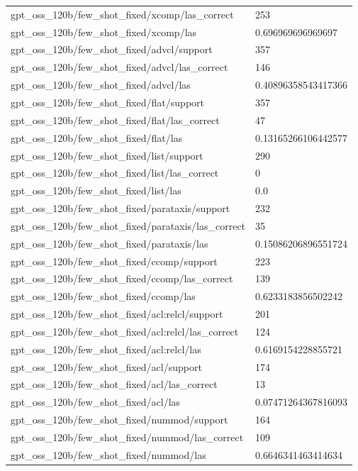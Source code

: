\begin{tabular}{ll}
gpt\_oss\_120b/few\_shot\_fixed/xcomp/las\_correct & 253 \\
gpt\_oss\_120b/few\_shot\_fixed/xcomp/las & 0.696969696969697 \\
gpt\_oss\_120b/few\_shot\_fixed/advcl/support & 357 \\
gpt\_oss\_120b/few\_shot\_fixed/advcl/las\_correct & 146 \\
gpt\_oss\_120b/few\_shot\_fixed/advcl/las & 0.40896358543417366 \\
gpt\_oss\_120b/few\_shot\_fixed/flat/support & 357 \\
gpt\_oss\_120b/few\_shot\_fixed/flat/las\_correct & 47 \\
gpt\_oss\_120b/few\_shot\_fixed/flat/las & 0.13165266106442577 \\
gpt\_oss\_120b/few\_shot\_fixed/list/support & 290 \\
gpt\_oss\_120b/few\_shot\_fixed/list/las\_correct & 0 \\
gpt\_oss\_120b/few\_shot\_fixed/list/las & 0.0 \\
gpt\_oss\_120b/few\_shot\_fixed/parataxis/support & 232 \\
gpt\_oss\_120b/few\_shot\_fixed/parataxis/las\_correct & 35 \\
gpt\_oss\_120b/few\_shot\_fixed/parataxis/las & 0.15086206896551724 \\
gpt\_oss\_120b/few\_shot\_fixed/ccomp/support & 223 \\
gpt\_oss\_120b/few\_shot\_fixed/ccomp/las\_correct & 139 \\
gpt\_oss\_120b/few\_shot\_fixed/ccomp/las & 0.6233183856502242 \\
gpt\_oss\_120b/few\_shot\_fixed/acl:relcl/support & 201 \\
gpt\_oss\_120b/few\_shot\_fixed/acl:relcl/las\_correct & 124 \\
gpt\_oss\_120b/few\_shot\_fixed/acl:relcl/las & 0.6169154228855721 \\
gpt\_oss\_120b/few\_shot\_fixed/acl/support & 174 \\
gpt\_oss\_120b/few\_shot\_fixed/acl/las\_correct & 13 \\
gpt\_oss\_120b/few\_shot\_fixed/acl/las & 0.07471264367816093 \\
gpt\_oss\_120b/few\_shot\_fixed/nummod/support & 164 \\
gpt\_oss\_120b/few\_shot\_fixed/nummod/las\_correct & 109 \\
gpt\_oss\_120b/few\_shot\_fixed/nummod/las & 0.6646341463414634 \\

\end{tabular}
